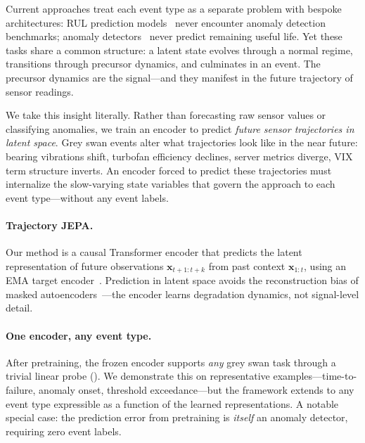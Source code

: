 \documentclass{article}
\newcommand{\x}{\mathbf{x}}
\begin{document}
Current approaches treat each event type as a separate problem with bespoke architectures: RUL prediction models~\citep{fan2024star,ttsnet2025} never encounter anomaly detection benchmarks; anomaly detectors~\citep{xu2022anomalytransformer,yang2023dcdetector} never predict remaining useful life. Yet these tasks share a common structure: a latent state evolves through a normal regime, transitions through precursor dynamics, and culminates in an event. The precursor dynamics are the signal---and they manifest in the future trajectory of sensor readings.

We take this insight literally. Rather than forecasting raw sensor values or classifying anomalies, we train an encoder to predict \emph{future sensor trajectories in latent space}. Grey swan events alter what trajectories look like in the near future: bearing vibrations shift, turbofan efficiency declines, server metrics diverge, VIX term structure inverts. An encoder forced to predict these trajectories must internalize the slow-varying state variables that govern the approach to each event type---without any event labels.

\paragraph{Trajectory JEPA.} Our method is a causal Transformer encoder that predicts the latent representation of future observations $\x_{t+1:t+k}$ from past context $\x_{1:t}$, using an EMA target encoder~\citep{grill2020byol,assran2023ijepa}. Prediction in latent space avoids the reconstruction bias of masked autoencoders~\citep{he2022mae}---the encoder learns degradation dynamics, not signal-level detail.

\paragraph{One encoder, any event type.} After pretraining, the frozen encoder supports \emph{any} grey swan task through a trivial linear probe (). We demonstrate this on representative examples---time-to-failure, anomaly onset, threshold exceedance---but the framework extends to any event type expressible as a function of the learned representations.  A notable special case: the prediction error from pretraining is \emph{itself} an anomaly detector, requiring zero event labels.
\end{document}
